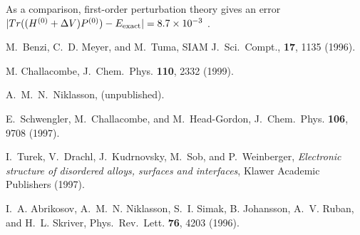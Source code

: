 \begin{references}
 As a comparison, first-order perturbation theory 
gives an error $|Tr((H^{(0)}+\Delta V)P^{(0)})-E_{\rm exact}| = 8.7 \times 10^{-3}$ .

 M.\ Benzi, C.\ D. Meyer, and M.\ Tuma,
SIAM J.\ Sci.\ Compt., {\bf 17}, 1135 (1996).

 M. Challacombe, 
J.\ Chem.\ Phys. {\bf 110}, 2332 (1999).










 A.\ M.\ N.\ Niklasson, (unpublished).

 E.\ Schwengler, M.\ Challacombe, and M.\ Head-Gordon,
J.\ Chem.\ Phys. {\bf 106}, 9708 (1997).

   I.\ Turek, V.\ Drachl, J.\ Kudrnovsky, M.\ Sob, and
P.\ Weinberger, {\it Electronic structure of disordered alloys, surfaces
and interfaces}, Klawer Academic Publishers (1997). 

 I.\ A. Abrikosov, A.\ M.\ N. Niklasson, S.\ I. Simak,
B. Johansson, A.\ V. Ruban, and H.\ L. Skriver,
Phys.\ Rev.\ Lett. {\bf 76}, 4203 (1996).


\end{references}

